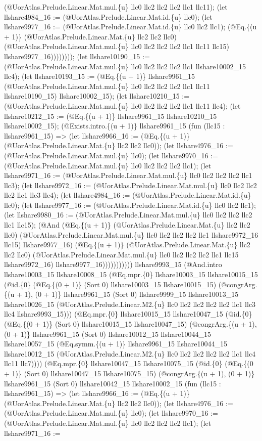 \documentclass[11pt]{article}
\begin{document}
(@UorAtlas.Prelude.Linear.Mat.mul.\{u\} llc0 llc2 llc2 llc2 llc1 llc11); (let llshare4984\_16 := (@UorAtlas.Prelude.Linear.Mat.id.\{u\} llc0); (let llshare9977\_16 := (@UorAtlas.Prelude.Linear.Mat.id.\{u\} llc0 llc2 llc1); (@Eq.\{(u + 1)\} (@UorAtlas.Prelude.Linear.Mat.\{u\} llc2 llc2 llc0) (@UorAtlas.Prelude.Linear.Mat.mul.\{u\} llc0 llc2 llc2 llc2 llc1 llc11 llc15) llshare9977\_16)))))))); (let llshare10190\_15 := (@UorAtlas.Prelude.Linear.Mat.mul.\{u\} llc0 llc2 llc2 llc2 llc1 llshare10002\_15 llc4); (let llshare10193\_15 := (@Eq.\{(u + 1)\} llshare9961\_15 (@UorAtlas.Prelude.Linear.Mat.mul.\{u\} llc0 llc2 llc2 llc2 llc1 llc11 llshare10190\_15) llshare10002\_15); (let llshare10210\_15 := (@UorAtlas.Prelude.Linear.Mat.mul.\{u\} llc0 llc2 llc2 llc2 llc1 llc11 llc4); (let llshare10212\_15 := (@Eq.\{(u + 1)\} llshare9961\_15 llshare10210\_15 llshare10002\_15); (@Exists.intro.\{(u + 1)\} llshare9961\_15 (fun (llc15 : llshare9961\_15) => (let llshare9966\_16 := (@Eq.\{(u + 1)\} (@UorAtlas.Prelude.Linear.Mat.\{u\} llc2 llc2 llc0)); (let llshare4976\_16 := (@UorAtlas.Prelude.Linear.Mat.mul.\{u\} llc0); (let llshare9970\_16 := (@UorAtlas.Prelude.Linear.Mat.mul.\{u\} llc0 llc2 llc2 llc2 llc1); (let llshare9971\_16 := (@UorAtlas.Prelude.Linear.Mat.mul.\{u\} llc0 llc2 llc2 llc2 llc1 llc3); (let llshare9972\_16 := (@UorAtlas.Prelude.Linear.Mat.mul.\{u\} llc0 llc2 llc2 llc2 llc1 llc3 llc4); (let llshare4984\_16 := (@UorAtlas.Prelude.Linear.Mat.id.\{u\} llc0); (let llshare9977\_16 := (@UorAtlas.Prelude.Linear.Mat.id.\{u\} llc0 llc2 llc1); (let llshare9980\_16 := (@UorAtlas.Prelude.Linear.Mat.mul.\{u\} llc0 llc2 llc2 llc2 llc1 llc15); (@And (@Eq.\{(u + 1)\} (@UorAtlas.Prelude.Linear.Mat.\{u\} llc2 llc2 llc0) (@UorAtlas.Prelude.Linear.Mat.mul.\{u\} llc0 llc2 llc2 llc2 llc1 llshare9972\_16 llc15) llshare9977\_16) (@Eq.\{(u + 1)\} (@UorAtlas.Prelude.Linear.Mat.\{u\} llc2 llc2 llc0) (@UorAtlas.Prelude.Linear.Mat.mul.\{u\} llc0 llc2 llc2 llc2 llc1 llc15 llshare9972\_16) llshare9977\_16))))))))))) llshare9993\_15 (@And.intro llshare10003\_15 llshare10008\_15 (@Eq.mpr.\{0\} llshare10003\_15 llshare10015\_15 (@id.\{0\} (@Eq.\{(0 + 1)\} (Sort 0) llshare10003\_15 llshare10015\_15) (@congrArg.\{(u + 1), (0 + 1)\} llshare9961\_15 (Sort 0) llshare9999\_15 llshare10013\_15 llshare10026\_15 (@UorAtlas.Prelude.Linear.M2.\{u\} llc0 llc2 llc2 llc2 llc2 llc1 llc3 llc4 llshare9993\_15))) (@Eq.mpr.\{0\} llshare10015\_15 llshare10047\_15 (@id.\{0\} (@Eq.\{(0 + 1)\} (Sort 0) llshare10015\_15 llshare10047\_15) (@congrArg.\{(u + 1), (0 + 1)\} llshare9961\_15 (Sort 0) llshare10012\_15 llshare10044\_15 llshare10057\_15 (@Eq.symm.\{(u + 1)\} llshare9961\_15 llshare10044\_15 llshare10012\_15 (@UorAtlas.Prelude.Linear.M2.\{u\} llc0 llc2 llc2 llc2 llc2 llc1 llc4 llc11 llc7)))) (@Eq.mpr.\{0\} llshare10047\_15 llshare10075\_15 (@id.\{0\} (@Eq.\{(0 + 1)\} (Sort 0) llshare10047\_15 llshare10075\_15) (@congrArg.\{(u + 1), (0 + 1)\} llshare9961\_15 (Sort 0) llshare10042\_15 llshare10002\_15 (fun (llc15 : llshare9961\_15) => (let llshare9966\_16 := (@Eq.\{(u + 1)\} (@UorAtlas.Prelude.Linear.Mat.\{u\} llc2 llc2 llc0)); (let llshare4976\_16 := (@UorAtlas.Prelude.Linear.Mat.mul.\{u\} llc0); (let llshare9970\_16 := (@UorAtlas.Prelude.Linear.Mat.mul.\{u\} llc0 llc2 llc2 llc2 llc1); (let llshare9971\_16 := 
\end{document}
